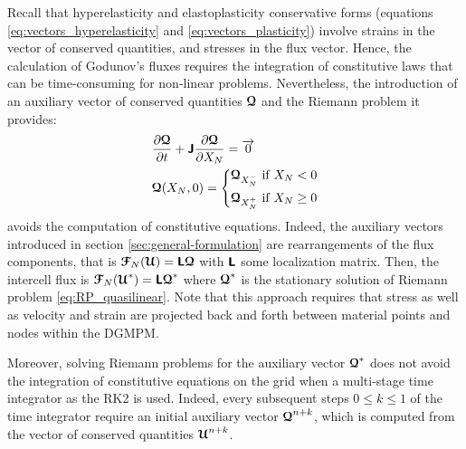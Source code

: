 Recall that hyperelasticity and elastoplasticity conservative forms (equations \eqref{eq:vectors_hyperelasticity} and \eqref{eq:vectors_plasticity}) involve strains in the vector of conserved quantities, and stresses in the flux vector.
Hence, the calculation of Godunov's fluxes requires the integration of constitutive laws that can be time-consuming for non-linear problems. Nevertheless, the introduction of an auxiliary vector of conserved quantities ${\boldsymbol{\mathcal{Q}}}$ and the Riemann problem it provides:
\begin{equation}
  \label{eq:RP_quasilinear}
  \begin{aligned}
    &\frac{\partial {\boldsymbol{\mathcal{Q}}}}{\partial t} + \boldsymbol{\mathsf{J}} \frac{\partial {\boldsymbol{\mathcal{Q}}}}{\partial X_N} = {\overrightarrow{0}}  \\
    & {\boldsymbol{\mathcal{Q}}}(X_N,0)= \left\lbrace 
      \begin{aligned}
        & {\boldsymbol{\mathcal{Q}}}_{X_N^-} \text{ if } X_N <0 \\
        & {\boldsymbol{\mathcal{Q}}}_{X_N^{+}} \text{ if } X_N \geq 0
      \end{aligned}
        \right.
  \end{aligned}
\end{equation}
avoids the computation of constitutive equations. Indeed, the auxiliary vectors introduced in section \ref{sec:general-formulation} are rearrangements of the flux components, that is ${\boldsymbol{\mathcal{F}}}_N({\boldsymbol{\mathcal{U}}})=\boldsymbol{\mathsf{L}} {\boldsymbol{\mathcal{Q}}}$ with $\boldsymbol{\mathsf{L}}$ some localization matrix. Then, the intercell flux is ${\boldsymbol{\mathcal{F}}}_N({\boldsymbol{\mathcal{U}}}^*)=\boldsymbol{\mathsf{L}} {\boldsymbol{\mathcal{Q}}}^*$ where ${\boldsymbol{\mathcal{Q}}}^*$  is the stationary solution of Riemann problem \eqref{eq:RP_quasilinear}. Note that this approach requires that stress as well as velocity and strain are projected back and forth between material points and nodes within the DGMPM.
\begin{remark}
  \label{rq:RK2_constitutive_update_nodes}
  Moreover, solving Riemann problems for the auxiliary vector ${\boldsymbol{\mathcal{Q}}}^*$ does not avoid the integration of constitutive equations on the grid when a multi-stage time integrator as the RK2 is used. Indeed, every subsequent steps $0 \leq k \leq 1$ of the time integrator require an initial auxiliary vector ${\boldsymbol{\mathcal{Q}}}^{n+k}$, which is computed from the vector of conserved quantities ${\boldsymbol{\mathcal{U}}}^{n+k}$.
\end{remark}

